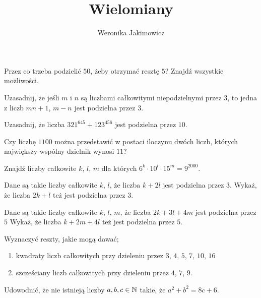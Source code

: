 \documentclass{article}
\title{Wielomiany}
\author{Weronika Jakimowicz}
\date{}
\begin{document}
\begin{zadanie}
  Przez co trzeba podzielić $50$, żeby otrzymać resztę $5$? Znajdź wszystkie możliwości.
\end{zadanie}

\begin{zadanie}
  Uzasadnij, że jeśli $m$ i $n$ są liczbami całkowitymi niepodzielnymi przez $3$, to jedna z liczb $mn+1$, $m-n$ jest podzielna przez $3$.
\end{zadanie}

\begin{zadanie}
  Uzasadnij, że liczba $321^{645}+123^{456}$ jest podzielna przez $10$.
\end{zadanie}

\begin{zadanie}
  Czy liczbę $1100$ można przedstawić w postaci iloczynu dwóch liczb, których największy wspólny dzielnik wynosi $11$?
\end{zadanie}

\begin{zadanie}
  Znajdź liczby całkowite $k$, $l$, $m$ dla których $6^k\cdot 10^l\cdot 15^m=9^{2000}$.
\end{zadanie}

\begin{zadanie}
  Dane są takie liczby całkowite $k$, $l$, że liczba $k+2l$ jest podzielna przez $3$. Wykaż, że liczba $2k+l$ też jest podzielna przez $3$.
\end{zadanie}

\begin{zadanie}
  Dane są takie liczby całkowite $k$, $l$, $m$, że liczba $2k+3l+4m$ jest podzielna przez $5$ Wykaż, że liczba $k+2m+4l$ też jest podzielna przez $5$.
\end{zadanie}

\begin{zadanie}
  Wyznaczyć reszty, jakie mogą dawać;
  \begin{enumerate}
    \item kwadraty liczb całkowitych przy dzieleniu przez $3$, $4$, $5$, $7$, $10$, $16$
    \item szcześciany liczb całkowitych przy dzieleniu przez $4$, $7$, $9$.
  \end{enumerate}
\end{zadanie}

\begin{zadanie}
  Udowodnić, że nie istnieją liczby $a,b,c\in\mathbb{N}$ takie, że $a^2+b^2=8c+6$.
\end{zadanie}
\end{document}

